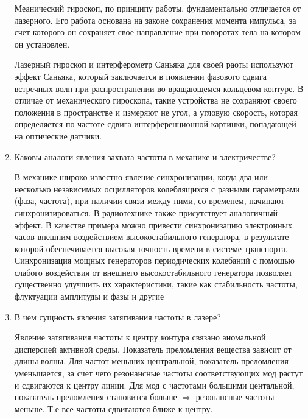 \documentclass[a4paper,12pt]{article}
\theoremstyle{plain} %
\theoremstyle{definition} %
\theoremstyle{remark} %
\begin{document}
\begin{enumerate}
	Меанический гироскоп, по принципу работы, фундаментально отличается от лазерного. Его работа основана на законе сохранения момента импульса, за счет которого он сохраняет свое направление при поворотах тела на котором он установлен. 
	
	Лазерный гироскоп и интерферометр Саньяка для своей раоты используют эффект Саньяка, который заключается в появлении фазового сдвига встречных волн при распространении во вращающемся кольцевом контуре. В отличае от механического гироскопа, такие устройства не сохраняют своего положения в пространстве и измеряют не угол, а угловую скорость, которая определяется по частоте сдвига интерференционной картинки, попадающей на оптические датчики.
	
	\item 
	Каковы аналоги явления захвата частоты в механике и электричестве?
	
	
	В механике широко известно явление синхронизации, когда два или несколько независимых осцилляторов колеблящихся с разными параметрами (фаза, частота), при наличии связи между ними, со временем, начинают синхронизироваться. В радиотехнике также присутствует аналогичный эффект. В качестве примера можно привести синхронизацию электронных часов внешним воздействием высокостабильного генератора, в результате которой обеспечивается высокая точность времени в системе транспорта. Синхронизация мощных генераторов периодических колебаний с помощью слабого воздействия от внешнего высокостабильного генератора позволяет существенно улучшить их характеристики, такие как стабильность частоты, флуктуации амплитуды и фазы и другие
	\item 
	В чем сущность явления затягивания частоты в лазере?
	
	
	Явление затягивания частоты к центру контура связано аномальной дисперсией активной среды. Показатель преломления вещества зависит от длины волны. Для частот меньших центральной, показатель преломления уменьшается, за счет чего резонансные частоты соответствующих мод растут и сдвигаются к центру линии. Для мод с частотами большими центальной, показатель преломления становится больше $ \Rightarrow $ резонансные частоты меньше. Т.е все частоты сдвигаются ближе к центру.
	\end{enumerate}
	
	
	
	
\end{document}
